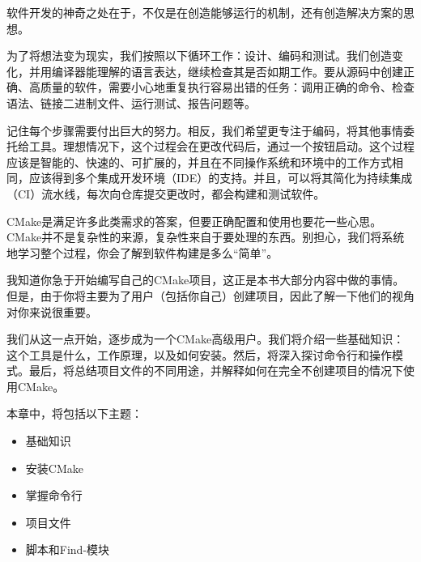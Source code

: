 
软件开发的神奇之处在于，不仅是在创造能够运行的机制，还有创造解决方案的思想。

为了将想法变为现实，我们按照以下循环工作：设计、编码和测试。我们创造变化，并用编译器能理解的语言表达，继续检查其是否如期工作。要从源码中创建正确、高质量的软件，需要小心地重复执行容易出错的任务：调用正确的命令、检查语法、链接二进制文件、运行测试、报告问题等。

记住每个步骤需要付出巨大的努力。相反，我们希望更专注于编码，将其他事情委托给工具。理想情况下，这个过程会在更改代码后，通过一个按钮启动。这个过程应该是智能的、快速的、可扩展的，并且在不同操作系统和环境中的工作方式相同，应该得到多个集成开发环境（IDE）的支持。并且，可以将其简化为持续集成（CI）流水线，每次向仓库提交更改时，都会构建和测试软件。

CMake是满足许多此类需求的答案，但要正确配置和使用也要花一些心思。CMake并不是复杂性的来源，复杂性来自于要处理的东西。别担心，我们将系统地学习整个过程，你会了解到软件构建是多么“简单”。

我知道你急于开始编写自己的CMake项目，这正是本书大部分内容中做的事情。但是，由于你将主要为了用户（包括你自己）创建项目，因此了解一下他们的视角对你来说很重要。

我们从这一点开始，逐步成为一个CMake高级用户。我们将介绍一些基础知识：这个工具是什么，工作原理，以及如何安装。然后，将深入探讨命令行和操作模式。最后，将总结项目文件的不同用途，并解释如何在完全不创建项目的情况下使用CMake。

本章中，将包括以下主题：

\begin{itemize}
\item
基础知识

\item
安装CMake

\item
掌握命令行

\item
项目文件

\item
脚本和Find-模块
\end{itemize}
























